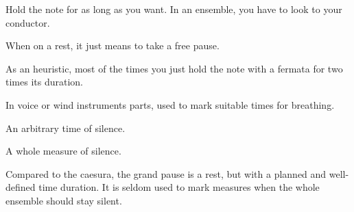 \begin{definition}
    Hold the note for as long as you want. In an ensemble, you have to look to your conductor.

    When on a rest, it just means to take a free pause.
\end{definition}

As an heuristic, most of the times you just hold the note with a fermata for two times its duration.

\begin{definition}
    In voice or wind instruments parts, used to mark suitable times for breathing.
\end{definition}

\begin{definition}[Caesura]
    An arbitrary time of silence.
\end{definition}

\begin{definition}
    A whole measure of silence.
\end{definition}

Compared to the caesura, the grand pause is a rest, but with a planned and well-defined time duration. It is seldom used to mark measures when the whole ensemble should stay silent.